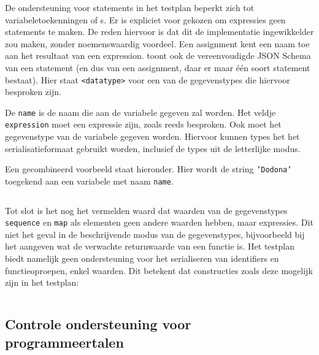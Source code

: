De ondersteuning voor statements in het testplan beperkt zich tot variabeletoekenningen of s.
Er is expliciet voor gekozen om expressies geen statements te maken.
De reden hiervoor is dat dit de implementatie ingewikkelder zou maken, zonder noemenswaardig voordeel.
Een assignment kent een naam toe aan het resultaat van een expression.
 toont ook de vereenvoudigde JSON Schema van een statement (en dus van een assignment, daar er maar één soort statement bestaat).
Hier staat \texttt{<datatype>} voor een van de gegevenstypes die hiervoor besproken zijn.

De \texttt{name} is de naam die aan de variabele gegeven zal worden.
Het veldje \texttt{expression} moet een expressie zijn, zoals reeds besproken.
Ook moet het gegevenstype van de variabele gegeven worden.
Hiervoor kunnen types het het serialisatieformaat gebruikt worden, inclusief de types uit de letterlijke modus.

Een gecombineerd voorbeeld staat hieronder.
Hier wordt de string \texttt{'Dodona'} toegekend aan een variabele met naam \texttt{name}.

\inputminted{json}{code/assign-variable.json}

Tot slot is het nog het vermelden waard dat waarden van de gegevenstypes \texttt{sequence} en \texttt{map} als elementen geen andere waarden hebben, maar expressies.
Dit niet het geval in de beschrijvende modus van de gegevenstypes, bijvoorbeeld bij het aangeven wat de verwachte returnwaarde van een functie is.
Het testplan biedt namelijk geen ondersteuning voor het serialiseren van identifiers en functieoproepen, enkel waarden.
Dit betekent dat constructies zoals deze mogelijk zijn in het testplan:

\inputminted{java}{code/advanced.jshell}

\subsection{Controle ondersteuning voor programmeertalen}\label{subsec:vereiste-functies}

